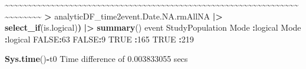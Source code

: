 \documentclass[
]{article}
\newenvironment{Shaded}{\begin{snugshade}}{\end{snugshade}}
\newcommand{\ConstantTok}[1]{\textcolor[rgb]{0.56,0.35,0.01}{#1}}
\newcommand{\DecValTok}[1]{\textcolor[rgb]{0.00,0.00,0.81}{#1}}
\newcommand{\ErrorTok}[1]{\textcolor[rgb]{0.64,0.00,0.00}{\textbf{#1}}}
\newcommand{\FloatTok}[1]{\textcolor[rgb]{0.00,0.00,0.81}{#1}}
\newcommand{\FunctionTok}[1]{\textcolor[rgb]{0.13,0.29,0.53}{\textbf{#1}}}
\newcommand{\NormalTok}[1]{#1}
\newcommand{\SpecialCharTok}[1]{\textcolor[rgb]{0.81,0.36,0.00}{\textbf{#1}}}
\begin{document}
\begin{Shaded}
\begin{Highlighting}[]
    \SpecialCharTok{\textasciitilde{}}\ErrorTok{\textasciitilde{}\textasciitilde{}\textasciitilde{}\textasciitilde{}\textasciitilde{}\textasciitilde{}\textasciitilde{}\textasciitilde{}\textasciitilde{}\textasciitilde{}\textasciitilde{}\textasciitilde{}\textasciitilde{}\textasciitilde{}\textasciitilde{}\textasciitilde{}\textasciitilde{}\textasciitilde{}\textasciitilde{}\textasciitilde{}\textasciitilde{}\textasciitilde{}\textasciitilde{}\textasciitilde{}\textasciitilde{}\textasciitilde{}\textasciitilde{}\textasciitilde{}\textasciitilde{}\textasciitilde{}\textasciitilde{}\textasciitilde{}\textasciitilde{}\textasciitilde{}\textasciitilde{}\textasciitilde{}\textasciitilde{}\textasciitilde{}\textasciitilde{}\textasciitilde{}\textasciitilde{}\textasciitilde{}\textasciitilde{}\textasciitilde{}\textasciitilde{}\textasciitilde{}\textasciitilde{}\textasciitilde{}\textasciitilde{}\textasciitilde{}\textasciitilde{}\textasciitilde{}\textasciitilde{}\textasciitilde{}\textasciitilde{}\textasciitilde{}\textasciitilde{}\textasciitilde{}\textasciitilde{}\textasciitilde{}\textasciitilde{}\textasciitilde{}\textasciitilde{}\textasciitilde{}\textasciitilde{}\textasciitilde{}\textasciitilde{}\textasciitilde{}\textasciitilde{}\textasciitilde{}\textasciitilde{}}    
 \ErrorTok{\textgreater{}}\NormalTok{ analyticDF\_time2event.Date.NA.rmAllNA }\SpecialCharTok{|\textgreater{}} \FunctionTok{select\_if}\NormalTok{(is.logical)}\ErrorTok{)} \SpecialCharTok{|\textgreater{}} \FunctionTok{summary}\NormalTok{()  }
\NormalTok{   event         StudyPopulation}
\NormalTok{ Mode }\SpecialCharTok{:}\NormalTok{logical   Mode }\SpecialCharTok{:}\NormalTok{logical  }
 \ConstantTok{FALSE}\SpecialCharTok{:}\DecValTok{63}        \ConstantTok{FALSE}\SpecialCharTok{:}\DecValTok{9}        
 \ConstantTok{TRUE} \SpecialCharTok{:}\DecValTok{165}       \ConstantTok{TRUE} \SpecialCharTok{:}\DecValTok{219}      
\end{Highlighting}
\end{Shaded}

\begin{Shaded}
\begin{Highlighting}[]
\FunctionTok{Sys.time}\NormalTok{()}\SpecialCharTok{{-}}\NormalTok{t0}
\NormalTok{Time difference of }\FloatTok{0.003833055}\NormalTok{ secs}
\end{Highlighting}
\end{Shaded}
\end{document}
